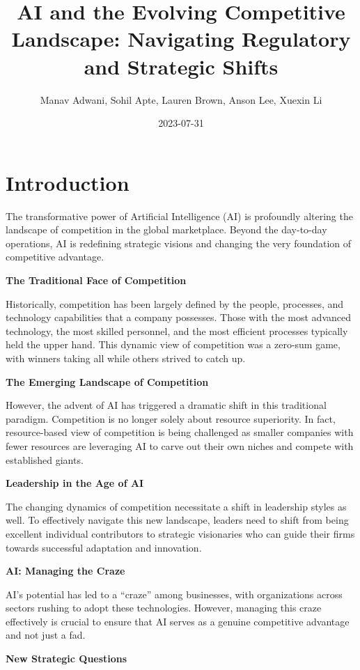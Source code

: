 \documentclass[
]{book}
\title{AI and the Evolving Competitive Landscape: Navigating Regulatory and Strategic Shifts}
\author{Manav Adwani, Sohil Apte, Lauren Brown, Anson Lee, Xuexin Li}
\date{2023-07-31}
\begin{document}
\maketitle

{
\setcounter{tocdepth}{1}
\tableofcontents
}
\hypertarget{introduction}{%
\chapter{Introduction}\label{introduction}}

The transformative power of Artificial Intelligence (AI) is profoundly altering the landscape of competition in the global marketplace. Beyond the day-to-day operations, AI is redefining strategic visions and changing the very foundation of competitive advantage.

\textbf{The Traditional Face of Competition}

Historically, competition has been largely defined by the people, processes, and technology capabilities that a company possesses. Those with the most advanced technology, the most skilled personnel, and the most efficient processes typically held the upper hand. This dynamic view of competition was a zero-sum game, with winners taking all while others strived to catch up.

\textbf{The Emerging Landscape of Competition}

However, the advent of AI has triggered a dramatic shift in this traditional paradigm. Competition is no longer solely about resource superiority. In fact, resource-based view of competition is being challenged as smaller companies with fewer resources are leveraging AI to carve out their own niches and compete with established giants.

\textbf{Leadership in the Age of AI}

The changing dynamics of competition necessitate a shift in leadership styles as well. To effectively navigate this new landscape, leaders need to shift from being excellent individual contributors to strategic visionaries who can guide their firms towards successful adaptation and innovation.

\textbf{AI: Managing the Craze}

AI's potential has led to a ``craze'' among businesses, with organizations across sectors rushing to adopt these technologies. However, managing this craze effectively is crucial to ensure that AI serves as a genuine competitive advantage and not just a fad.

\textbf{New Strategic Questions}
\end{document}
